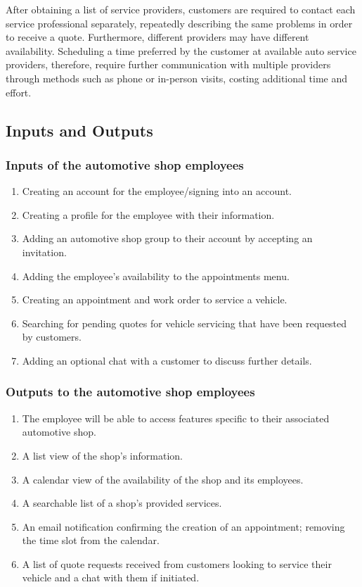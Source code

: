 \documentclass{article}
\begin{document}
\noindent After obtaining a list of service providers, customers are required
to contact each service professional separately, repeatedly describing the same
problems in order to receive a quote. Furthermore, different providers may have
different availability. Scheduling a time preferred by the customer at
available auto service providers, therefore, require further communication with
multiple providers through methods such as phone or in-person visits, costing
additional time and effort.

\subsection{Inputs and Outputs}


\subsubsection{Inputs of the automotive shop employees}
\begin{enumerate}
    \item Creating an account for the employee/signing into an account.
    \item Creating a profile for the employee with their information.
    \item Adding an automotive shop group to their account by accepting an invitation.
    \item Adding the employee's availability to the appointments menu.
    \item Creating an appointment and work order to service a vehicle.
    \item Searching for pending quotes for vehicle servicing that have been requested by customers.
    \item Adding an optional chat with a customer to discuss further details.
\end{enumerate}

\subsubsection{Outputs to the automotive shop employees}
\begin{enumerate}
    \item The employee will be able to access features specific to their associated automotive shop.
    \item A list view of the shop's information.
    \item A calendar view of the availability of the shop and its employees.
    \item A searchable list of a shop's provided services.
    \item An email notification confirming the creation of an appointment; removing the time slot from the calendar.
    \item A list of quote requests received from customers looking to service their vehicle and a chat with them if initiated.
\end{enumerate}
\end{document}

